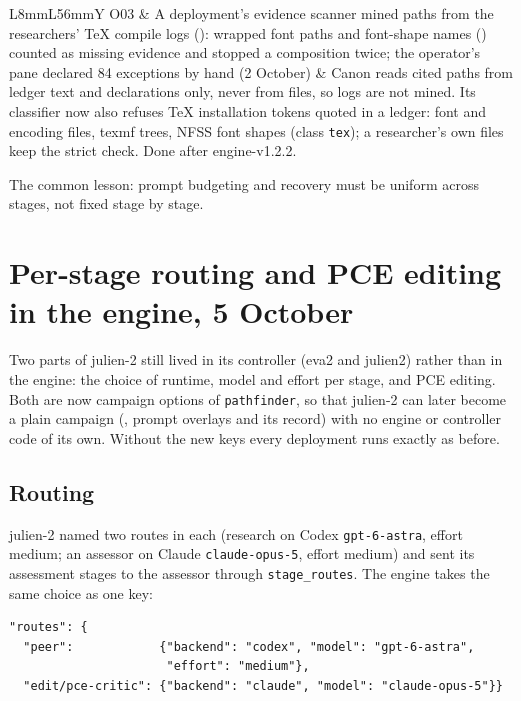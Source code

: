 \documentclass[11pt,a4paper]{article}
\begin{document}
{\begin{xltabular}{\linewidth}{L{8mm}L{56mm}Y}
O03 & A deployment's evidence scanner mined paths from the researchers' TeX compile logs (): wrapped font paths and font-shape names () counted as missing evidence and stopped a composition twice; the operator's pane declared 84 exceptions by hand (2 October) & Canon reads cited paths from ledger text and declarations only, never from files, so logs are not mined. Its classifier now also refuses TeX installation tokens quoted in a ledger: font and encoding files, texmf trees, NFSS font shapes (class \texttt{tex}); a researcher's own files keep the strict check. Done after engine-v1.2.2.\\
\end{xltabular}}

The common lesson: prompt budgeting and recovery must be uniform across stages, not
fixed stage by stage.

\section{Per-stage routing and PCE editing in the engine, 5 October}\label{sec:routing-pce}

Two parts of julien-2 still lived in its controller (eva2 and julien2) rather than in the
engine: the choice of runtime, model and effort per stage, and PCE editing. Both are now
campaign options of \texttt{pathfinder}, so that julien-2 can later become a plain campaign
(, prompt overlays and its record) with no engine or controller code of
its own. Without the new keys every deployment runs exactly as before.

\subsection{Routing}

julien-2 named two routes in each  (research on Codex
\texttt{gpt-6-astra}, effort medium; an assessor on Claude \texttt{claude-opus-5}, effort
medium) and sent its assessment stages to the assessor through \texttt{stage\_routes}. The
engine takes the same choice as one key:

\begin{verbatim}
"routes": {
  "peer":            {"backend": "codex", "model": "gpt-6-astra",
                      "effort": "medium"},
  "edit/pce-critic": {"backend": "claude", "model": "claude-opus-5"}}
\end{verbatim}
\end{document}
